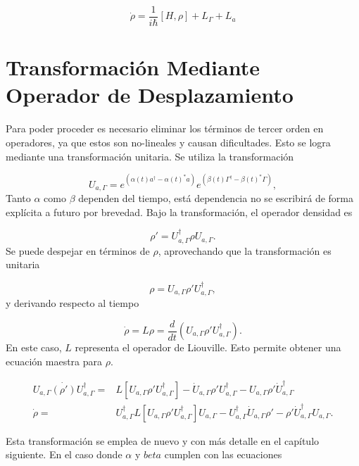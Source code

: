 \documentclass[10pt,a4paper]{report}
\begin{document}
\begin{equation}
\dot{\rho} = \frac{1}{i\hbar}[H,\rho] + L_\Gamma + L_a
\end{equation} 


\section{Transformación Mediante Operador de Desplazamiento}

Para poder proceder es necesario eliminar los términos de tercer orden en operadores, ya que estos son no-lineales y causan dificultades. Esto se logra mediante una transformación unitaria. Se utiliza la transformación

\begin{equation}
U_{a,\Gamma} = e^{(\alpha(t) a^\dagger - \alpha(t)^*a)}e^{(\beta(t) \Gamma^\dagger - \beta(t)^*\Gamma)},
\end{equation} Tanto $\alpha$ como $\beta$ dependen del tiempo, está dependencia no se escribirá de forma explícita a futuro por brevedad. Bajo la transformación, el operador densidad es

\begin{equation}
\rho' = U_{a,\Gamma}^\dagger \rho U_{a,\Gamma}.
\end{equation} Se puede despejar en términos de $\rho$, aprovechando que la transformación es unitaria

\begin{equation}
\rho = U_{a,\Gamma} \rho' U_{a,\Gamma}^\dagger,
\end{equation} y derivando respecto al tiempo

\begin{equation}
\dot{\rho} = L\rho = \frac{d}{dt}(U_{a,\Gamma} \rho' U_{a,\Gamma}^\dagger).
\end{equation} En este caso, $L$ representa el operador de Liouville. Esto permite obtener una ecuación maestra para $\rho$. 

\begin{align}
 U_{a,\Gamma} \dot{(\rho')} U_{a,\Gamma}^\dagger =& L[U_{a,\Gamma} \rho' U_{a,\Gamma}^\dagger] - \dot{U}_{a,\Gamma}\rho'U_{a,\Gamma}^\dagger -U_{a,\Gamma} \rho' \dot{U}_{a,\Gamma}^\dagger\\
\dot{\rho} =& U_{a,\Gamma}^\dagger L[U_{a,\Gamma} \rho' U_{a,\Gamma}^\dagger]U_{a,\Gamma}-U_{a,\Gamma}^\dagger\dot{U}_{a,\Gamma}\rho'-\rho'\dot{U}_{a,\Gamma}^\dagger U_{a,\Gamma}.
\end{align}

Esta transformación se emplea de nuevo y con más detalle en el capítulo siguiente. En el caso donde $\alpha$ y $beta$ cumplen con las ecuaciones
\end{document}
